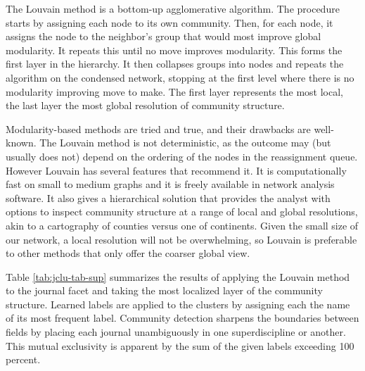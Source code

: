 \documentclass[]{book}
\theoremstyle{definition}
\theoremstyle{definition}
\theoremstyle{definition}
\theoremstyle{remark}
\begin{document}
The Louvain method is a bottom-up agglomerative algorithm. The procedure
starts by assigning each node to its own community. Then, for each node,
it assigns the node to the neighbor's group that would most improve
global modularity. It repeats this until no move improves modularity.
This forms the first layer in the hierarchy. It then collapses groups
into nodes and repeats the algorithm on the condensed network, stopping
at the first level where there is no modularity improving move to make.
The first layer represents the most local, the last layer the most
global resolution of community structure.

Modularity-based methods are tried and true, and their drawbacks are
well-known. The Louvain method is not deterministic, as the outcome may
(but usually does not) depend on the ordering of the nodes in the
reassignment queue. However Louvain has several features that recommend
it. It is computationally fast on small to medium graphs and it is
freely available in network analysis software. It also gives a
hierarchical solution that provides the analyst with options to inspect
community structure at a range of local and global resolutions, akin to
a cartography of counties versus one of continents. Given the small size
of our network, a local resolution will not be overwhelming, so Louvain
is preferable to other methods that only offer the coarser global view.

Table \ref{tab:jclu-tab-sup} summarizes the results of applying the
Louvain method to the journal facet and taking the most localized layer
of the community structure. Learned labels are applied to the clusters
by assigning each the name of its most frequent label. Community
detection sharpens the boundaries between fields by placing each journal
unambiguously in one superdiscipline or another. This mutual exclusivity
is apparent by the sum of the given labels exceeding 100 percent.
\end{document}
